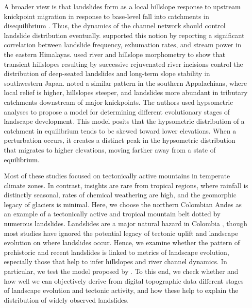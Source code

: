 \documentclass[draft]{agujournal2019}
\begin{document}
\par A broader view is that landslides form as a local hillslope response to upstream knickpoint migration in response to base-level fall into catchments in disequilibrium \cite{Wobus2006, hovius2006, Whipple2002}. Thus, the dynamics of the channel network should control landslide distribution \cite{montgomery1994, burbank1996} eventually.  supported this notion by reporting a significant correlation between landslide frequency, exhumation rates, and stream power in the eastern Himalayas.  used river and hillslope morphometry to show that transient hillslopes resulting by successive rejuvenated river incisions control the distribution of deep-seated landslides and long-term slope stability in southwestern Japan.  noted a similar pattern in the southern Appalachians, where local relief is higher, hillslopes steeper, and landslides more abundant in tributary catchments downstream of major knickpoints. The authors used hypsometric analyses to propose a model for determining different evolutionary stages of landscape development. This model posits that the hypsometric distribution of a catchment in equilibrium tends to be skewed toward lower elevations. When a perturbation occurs, it creates a distinct peak in the hypsometric distribution that migrates to higher elevations, moving farther away from a state of equilibrium. 

\par Most of these studies focused on tectonically active mountains in temperate climate zones. In contrast, insights are rare from tropical regions, where rainfall is distinctly seasonal, rates of chemical weathering are high, and the geomorphic legacy of glaciers is minimal. Here, we choose the northern Colombian Andes as an example of a tectonically active and tropical mountain belt dotted by numerous landslides. Landslides are a major natural hazard in Colombia \cite{gomez2023spatial, aristizabal2020}, though most studies have ignored the potential legacy of tectonic uplift and landscape evolution on where landslides occur. Hence, we examine whether the pattern of prehistoric and recent landslides is linked to metrics of landscape evolution, especially those that help to infer hillslopes and river channel dynamics. In particular, we test the model proposed by . To this end, we check whether and how well we can objectively derive from digital topographic data different stages of landscape evolution and tectonic activity, and how these help to explain the distribution of widely observed landslides.
\end{document}
